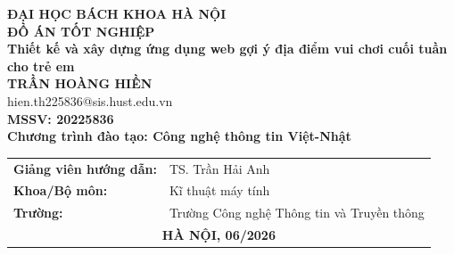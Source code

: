 \documentclass[DoAn.tex]{subfiles}
\begin{document}
\begin{titlepage}
\thispagestyle{empty}
\begin{center}

{\textbf{\large{ĐẠI HỌC BÁCH KHOA HÀ NỘI}}}\\[4cm]

{\textbf{\huge{ĐỒ ÁN TỐT NGHIỆP}}}\\[1cm]
{\textbf{\Large{Thiết kế và xây dựng ứng dụng web gợi ý địa điểm vui chơi cuối tuần cho trẻ em}}}\\[1cm]

{\textbf{\large{TRẦN HOÀNG HIỀN}}}\\
{\large{hien.th225836@sis.hust.edu.vn}}\\[0.5cm]
{\textbf{\large{MSSV: 20225836}}}\\[0.5cm]
{\textbf{\large{Chương trình đào tạo: Công nghệ thông tin Việt-Nhật}}}\\

\vspace{3.2cm}
\begin{table}[H]
\centering
\begin{tabular}{p{6cm}p{8cm}}
\textbf{Giảng viên hướng dẫn:} & TS. Trần Hải Anh \hspace{0.5cm} \\[0.5cm]
\textbf{Khoa/Bộ môn:} & Kĩ thuật máy tính \\[0.5cm]
\textbf{Trường:} & Trường Công nghệ Thông tin và Truyền thông \\[3.2cm]
\multicolumn{2}{c}{\textbf{HÀ NỘI, 06/2026}}
\end{tabular}
\end{table}
\end{center}
\end{titlepage}
\end{document}

